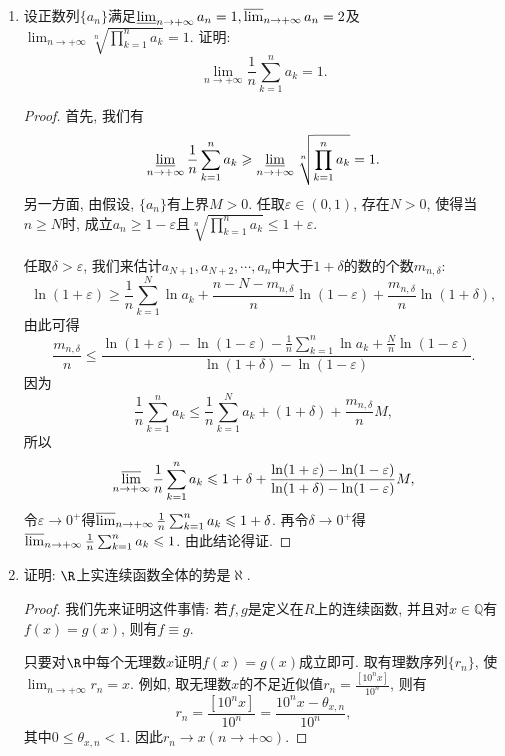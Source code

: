 \begin{2b}
\begin{enumerate}
\begin{proof}[解答]
任取 $\varepsilon>0$，令 $k=k_{\varepsilon}$ 足够大使得 $1 \leqslant 10a_k+a_{k+1} \leqslant 98, \frac{1}{10^{2k}} \leqslant \varepsilon$，
则当 $|x-x_0|<\frac{1}{10^{k+1}}$成立时 $x$ 小数点后的前 $k-1$ 位数必然与 $x_0$ 的前 $k-1$ 位数相同，
此时 $|f(x)-f(x_0)|<\frac{10}{10^{2k+1}}<\varepsilon$。因此，$f(x)$ 在 $x_0$ 点连续。

最后，事实上在有限小数处，$f(x)$ 仍然具有右连续性。
\end{proof}
\item 设正数列\(\{a_n\}\)满足\(\varliminf_{n\rightarrow+\infty}a_n=1,\varlimsup_{n\rightarrow+\infty}a_n=2\)及\(\lim_{n\rightarrow+\infty}\sqrt[n]{\prod_{k=1}^{n}a_k}=1\). 证明: 
\[\lim_{n\rightarrow+\infty}\frac{1}{n}\sum_{k=1}^{n}a_k=1.\]
\begin{proof}
首先, 我们有\[\varliminf_{n\rightarrow+\infty}\frac{1}{n}\sum_{k=1}^{n}a_k\geqslant \varliminf_{n\rightarrow+\infty}\sqrt[n]{\displaystyle\prod_{k=1}^{n}a_k}=1.\]
另一方面, 由假设, \(\{a_n\}\)有上界\(M>0\). 
任取\(\varepsilon\in(0,1)\), 存在\(N>0\), 使得当\(n\geqslant N\)时, 成立\(a_n\geqslant 1-\varepsilon\)且\(\sqrt[n]{\displaystyle\prod_{k=1}^{n}a_k}\leqslant 1+\varepsilon\).

任取\(\delta>\varepsilon\), 我们来估计\(a_{N+1},a_{N+2},\cdots,a_n\)中大于\(1+\delta\)的数的个数\(m_{n,\delta}\):
\[\ln(1+\varepsilon)\geqslant\frac{1}{n}\sum_{k=1}^{N}\ln a_k+\frac{n-N-m_{n,\delta}}{n}\ln(1-\varepsilon)+\frac{m_{n,\delta}}{n}\ln(1+\delta),\]
由此可得\[\frac{m_{n,\delta}}{n}\leqslant\frac{\displaystyle\ln(1+\varepsilon)-\ln(1-\varepsilon)-\frac{1}{n}\sum_{k=1}^{n}\ln a_k+\frac{N}{n}\ln(1-\varepsilon)}{\ln(1+\delta)-\ln(1-\varepsilon)}.\]
因为\[\frac{1}{n}\sum_{k=1}^{n}a_k\leqslant\frac{1}{n}\sum_{k=1}^{N}a_k+(1+\delta)+\frac{m_{n,\delta}}{n}M,\]
所以\[\varlimsup_{n\rightarrow+\infty}\frac{1}{n}\sum_{k=1}^{n}a_k\leqslant 1+\delta+\frac{\ln(1+\varepsilon)-\ln(1-\varepsilon)}{\ln(1+\delta)-\ln(1-\varepsilon)}M,\]
令\(\varepsilon\rightarrow 0^+\)得\(\varlimsup_{n\rightarrow+\infty}\frac{1}{n}\sum_{k=1}^{n}a_k\leqslant 1+\delta\). 
再令\(\delta\rightarrow 0^+\)得\(\varlimsup_{n\rightarrow+\infty}\frac{1}{n}\sum_{k=1}^{n}a_k\leqslant 1\). 由此结论得证.
\end{proof}
\item 证明: \(\R\)上实连续函数全体的势是\(\aleph\).
\begin{proof}
我们先来证明这件事情: 若\(f,g\)是定义在\(R\)上的连续函数, 
并且对\(x\in\mathbb{Q}\)有\(f(x)=g(x)\), 则有\(f\equiv g\).

只要对\(\R\)中每个无理数\(x\)证明\(f(x)=g(x)\)成立即可. 
取有理数序列\(\{r_n\}\), 使\(\lim_{n\rightarrow+\infty}r_n=x\). 
例如, 取无理数\(x\)的不足近似值\(r_n=\frac{\left[10^nx\right]}{10^n}\), 则有
\[r_n=\frac{\left[10^nx\right]}{10^n}=\frac{10^nx-\theta_{x,n}}{10^n},\]
其中\(0\leqslant\theta_{x,n}<1\). 因此\(r_n\rightarrow x(n\rightarrow+\infty)\).


\end{proof}
\end{enumerate}
\end{2b}
